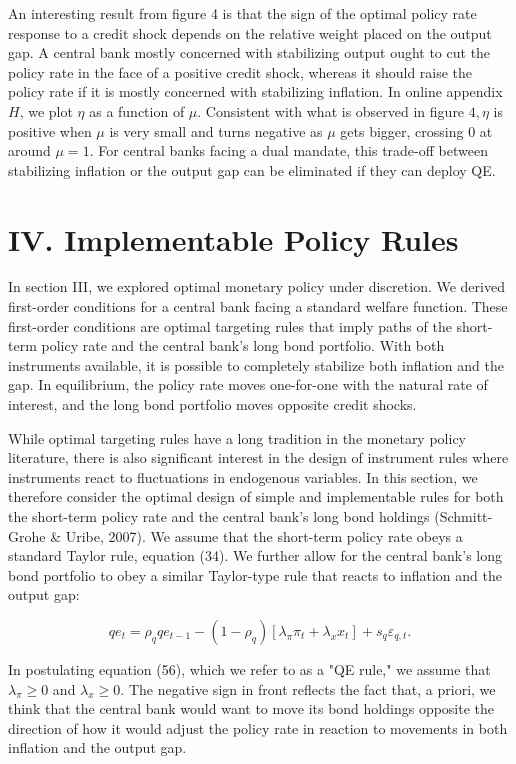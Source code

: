 \documentclass[10pt]{article}
\begin{document}
An interesting result from figure 4 is that the sign of the optimal policy rate response to a credit shock depends on the relative weight placed on the output gap. A central bank mostly concerned with stabilizing output ought to cut the policy rate in the face of a positive credit shock, whereas it should raise the policy rate if it is mostly concerned with stabilizing inflation. In online appendix $H$, we plot $\eta$ as a function of $\mu$. Consistent with what is observed in figure $4, \eta$ is positive when $\mu$ is very small and turns negative as $\mu$ gets bigger, crossing 0 at around $\mu=1$. For central banks facing a dual mandate, this trade-off between stabilizing inflation or the output gap can be eliminated if they can deploy QE.

\section*{IV. Implementable Policy Rules}
In section III, we explored optimal monetary policy under discretion. We derived first-order conditions for a central bank facing a standard welfare function. These first-order conditions are optimal targeting rules that imply paths of the short-term policy rate and the central bank's long bond portfolio. With both instruments available, it is possible to completely stabilize both inflation and the gap. In equilibrium, the policy rate moves one-for-one with the natural rate of interest, and the long bond portfolio moves opposite credit shocks.

While optimal targeting rules have a long tradition in the monetary policy literature, there is also significant interest in the design of instrument rules where instruments react to fluctuations in endogenous variables. In this section, we therefore consider the optimal design of simple and implementable rules for both the short-term policy rate and the central bank's long bond holdings (Schmitt-Grohe \& Uribe, 2007). We assume that the short-term policy rate obeys a standard Taylor rule, equation (34). We further allow for the central bank's long bond portfolio to obey a similar Taylor-type rule that reacts to inflation and the output gap:

\begin{equation*}
q e_{t}=\rho_{q} q e_{t-1}-\left(1-\rho_{q}\right)\left[\lambda_{\pi} \pi_{t}+\lambda_{x} x_{t}\right]+s_{q} \varepsilon_{q, t} . \tag{56}
\end{equation*}

In postulating equation (56), which we refer to as a "QE rule," we assume that $\lambda_{\pi} \geq 0$ and $\lambda_{x} \geq 0$. The negative sign in front reflects the fact that, a priori, we think that the central bank would want to move its bond holdings opposite the direction of how it would adjust the policy rate in reaction to movements in both inflation and the output gap.
\end{document}
